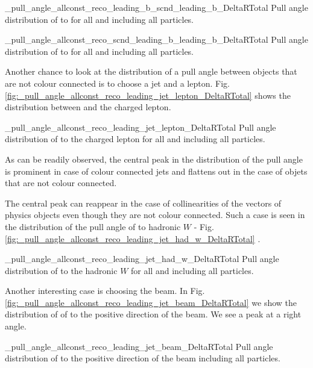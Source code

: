           {_pull_angle_allconst_reco_leading_b_scnd_leading_b_DeltaRTotal}
          {Pull angle distribution of \leadingb to \scndleadingb for all \DeltaR and including all particles.}

          {_pull_angle_allconst_reco_scnd_leading_b_leading_b_DeltaRTotal}
          {Pull angle distribution of \scndleadingb to \leadingb for all \DeltaR and including all particles.}


Another chance to look at the distribution of a pull angle between objects that are not colour connected is to choose a jet and a lepton. Fig. \ref{fig:_pull_angle_allconst_reco_leading_jet_lepton_DeltaRTotal} shows the distribution between \leadingjet and the charged lepton. 

          {_pull_angle_allconst_reco_leading_jet_lepton_DeltaRTotal}
          {Pull angle distribution of \leadingjet to the charged lepton for all \DeltaR and including all particles.}

As can be readily observed, the central peak in the distribution of the pull angle is prominent in case of colour connected jets and flattens out in the case of objets that are not colour connected.

The central peak can reappear in the case of collinearities of the vectors of physics objects even though they are not colour connected. Such a case is seen in the distribution of the pull angle of \leadingjet to hadronic $W$ - Fig. \ref{fig:_pull_angle_allconst_reco_leading_jet_had_w_DeltaRTotal}
. 

          {_pull_angle_allconst_reco_leading_jet_had_w_DeltaRTotal}
          {Pull angle distribution of \leadingjet to the hadronic $W$ for all \DeltaR and including all particles.}

Another interesting case is choosing the beam. In Fig. \ref{fig:_pull_angle_allconst_reco_leading_jet_beam_DeltaRTotal} we show the distribution of \pullangle of \leadingjet to the positive direction of the beam. We see a peak at a right angle.

          {_pull_angle_allconst_reco_leading_jet_beam_DeltaRTotal}
          {Pull angle distribution of \leadingjet to the positive direction of the beam including all particles.}

